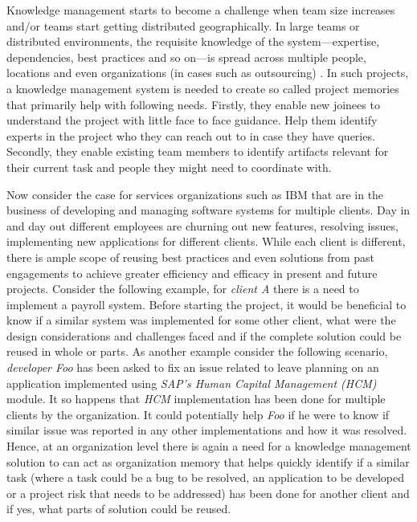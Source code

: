 Knowledge management starts to become a challenge when team size increases and/or teams start getting distributed geographically. In large teams or distributed environments, the requisite knowledge of the system---expertise, dependencies, best practices and so on---is spread across multiple people, locations and even organizations (in cases such as outsourcing) \cite{Desouza:2006}. In such projects, a knowledge management system is needed to create so called project memories that primarily help with following needs. Firstly, they enable new joinees to understand the project with little face to face guidance. Help them identify experts in the project who they can reach out to in case they have queries. Secondly, they enable existing team members to identify artifacts relevant for their current task and people they might need to coordinate with. 

Now consider the case for services organizations such as IBM that are in the business of developing and managing software systems for multiple clients. Day in and day out different employees are churning out new features, resolving issues, implementing new applications for different clients. While each client is different, there is ample scope of reusing best practices and even solutions from past engagements to achieve greater efficiency and efficacy in present and future projects. Consider the following example, for \textit{client A} there is a need to implement a payroll system. Before starting the project, it would be beneficial to know if a similar system was implemented for some other client, what were the design considerations and challenges faced and if the complete solution could be reused in whole or parts. As another example consider the following scenario, \textit{developer Foo} has been asked to fix an issue related to leave planning on an application implemented using \textit{SAP's Human Capital Management (HCM)} module. It so happens that \textit{HCM} implementation has been done for multiple clients by the organization. It could potentially help \textit{Foo} if he were to know if similar issue was reported in any other implementations and how it was resolved. Hence, at an organization level there is again a need for a knowledge management solution to can act as organization memory \cite{Stein:1995} that helps quickly identify if a similar task (where a task could be a bug to be resolved, an application to be developed or a project risk that needs to be addressed) has been done for another client and if yes, what parts of solution could be reused.

